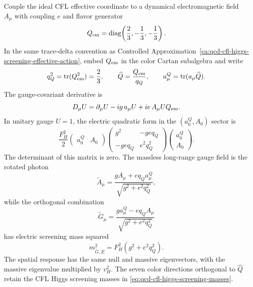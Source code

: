 \begin{proposition}
\label{prop:qcd-cfl-rotated-electromagnetic-response}
Couple the ideal CFL effective coordinate to a dynamical electromagnetic
field \(A_\mu\) with coupling \(e\) and flavor generator
\[
  Q_{\rm em}
  =
  \operatorname{diag}\!\left(\frac23,-\frac13,-\frac13\right).
\]
In the same trace-delta convention as
Controlled Approximation~\ref{ca:qcd-cfl-higgs-screening-effective-action},
embed \(Q_{\rm em}\) in the color Cartan subalgebra and write
\[
  q_Q^2=\operatorname{tr}(Q_{\rm em}^2)=\frac23,
  \qquad
  \widehat Q=\frac{Q_{\rm em}}{q_Q},
  \qquad
  a_\mu^Q=\operatorname{tr}(a_\mu\widehat Q).
\]
The gauge-covariant derivative is
\begin{equation}
  D_\mu U
  =
  \partial_\mu U-i g\,a_\mu U+i e\,A_\mu UQ_{\rm em}.
  \label{eq:qcd-cfl-qed-covariant-derivative}
\end{equation}
In unitary gauge \(U=1\), the electric quadratic form in the
\((a_0^Q,A_0)\) sector is
\begin{equation}
  \frac{F_H^2}{2}
  \begin{pmatrix}a_0^Q&A_0\end{pmatrix}
  \begin{pmatrix}
    g^2 & -g e q_Q\\
    -g e q_Q & e^2 q_Q^2
  \end{pmatrix}
  \begin{pmatrix}a_0^Q\\ A_0\end{pmatrix}.
  \label{eq:qcd-cfl-rotated-em-mass-matrix}
\end{equation}
The determinant of this matrix is zero.  The massless long-range gauge field
is the rotated photon
\begin{equation}
  \widetilde A_\mu
  =
  \frac{g A_\mu+e q_Q a_\mu^Q}{\sqrt{g^2+e^2q_Q^2}},
  \label{eq:qcd-cfl-rotated-photon}
\end{equation}
while the orthogonal combination
\begin{equation}
  \widetilde G_\mu
  =
  \frac{g a_\mu^Q-e q_Q A_\mu}{\sqrt{g^2+e^2q_Q^2}}
  \label{eq:qcd-cfl-screened-em-gluon}
\end{equation}
has electric screening mass squared
\[
  m_{\widetilde G,E}^2
  =
  F_H^2(g^2+e^2q_Q^2).
\]
The spatial response has the same null and massive eigenvectors, with the
massive eigenvalue multiplied by \(v_H^2\).  The seven color directions
orthogonal to \(\widehat Q\) retain the CFL Higgs screening masses in
\eqref{eq:qcd-cfl-higgs-screening-masses}.


\end{proposition}
